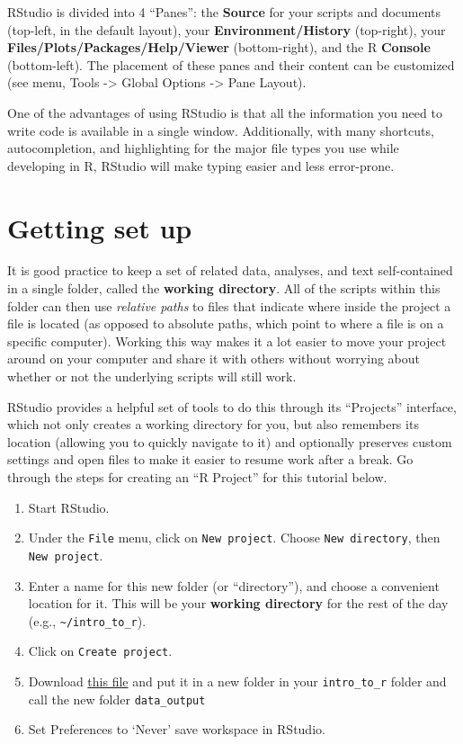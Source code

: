 \documentclass[]{book}
\providecommand{\tightlist}{%
  \setlength{\itemsep}{0pt}\setlength{\parskip}{0pt}}
\begin{document}
RStudio is divided into 4 ``Panes'': the \textbf{Source} for your
scripts and documents (top-left, in the default layout), your
\textbf{Environment/History} (top-right), your
\textbf{Files/Plots/Packages/Help/Viewer} (bottom-right), and the R
\textbf{Console} (bottom-left). The placement of these panes and their
content can be customized (see menu, Tools -\textgreater{} Global
Options -\textgreater{} Pane Layout).

One of the advantages of using RStudio is that all the information you
need to write code is available in a single window. Additionally, with
many shortcuts, autocompletion, and highlighting for the major file
types you use while developing in R, RStudio will make typing easier and
less error-prone.

\section{Getting set up}\label{getting-set-up}

It is good practice to keep a set of related data, analyses, and text
self-contained in a single folder, called the \textbf{working
directory}. All of the scripts within this folder can then use
\emph{relative paths} to files that indicate where inside the project a
file is located (as opposed to absolute paths, which point to where a
file is on a specific computer). Working this way makes it a lot easier
to move your project around on your computer and share it with others
without worrying about whether or not the underlying scripts will still
work.

RStudio provides a helpful set of tools to do this through its
``Projects'' interface, which not only creates a working directory for
you, but also remembers its location (allowing you to quickly navigate
to it) and optionally preserves custom settings and open files to make
it easier to resume work after a break. Go through the steps for
creating an ``R Project'' for this tutorial below.

\begin{enumerate}
\def\labelenumi{\arabic{enumi}.}
\tightlist
\item
  Start RStudio.
\item
  Under the \texttt{File} menu, click on \texttt{New\ project}. Choose
  \texttt{New\ directory}, then \texttt{New\ project}.
\item
  Enter a name for this new folder (or ``directory''), and choose a
  convenient location for it. This will be your \textbf{working
  directory} for the rest of the day (e.g.,
  \texttt{\textasciitilde{}/intro\_to\_r}).
\item
  Click on \texttt{Create\ project}.
\item
  Download
  \href{https://drive.google.com/file/d/1GnrIlrcxDUmlVm40Tx9LawfxaeSh5Mu1/view?usp=sharing}{this
  file} and put it in a new folder in your \texttt{intro\_to\_r} folder
  and call the new folder \texttt{data\_output}
\item
  Set Preferences to `Never' save workspace in RStudio.
\end{enumerate}
\end{document}
